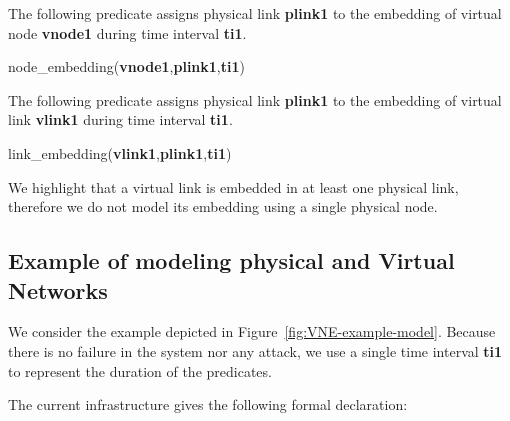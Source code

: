 The following predicate assigns physical link \textbf{plink1} to the embedding of virtual node \mbox{\textbf{vnode1}} during time interval \textbf{ti1}.
\begin{myformula}
node\_embedding(\textbf{vnode1},\textbf{plink1},\textbf{ti1})
\end{myformula}


The following predicate assigns physical link \textbf{plink1} to the embedding of virtual link \textbf{vlink1} during time interval \textbf{ti1}.
\begin{myformula}
link\_embedding(\textbf{vlink1},\textbf{plink1},\textbf{ti1})
\end{myformula}


We highlight that a virtual link is embedded in at least one physical link, therefore we do not model its embedding using a single physical node.


\subsection{Example of modeling physical and Virtual Networks}

We consider the example depicted in Figure~\ref{fig:VNE-example-model}.
Because there is no failure in the system nor any attack, we use a single time interval \textbf{ti1} to represent the duration of the predicates.



The current infrastructure gives the following formal declaration:

